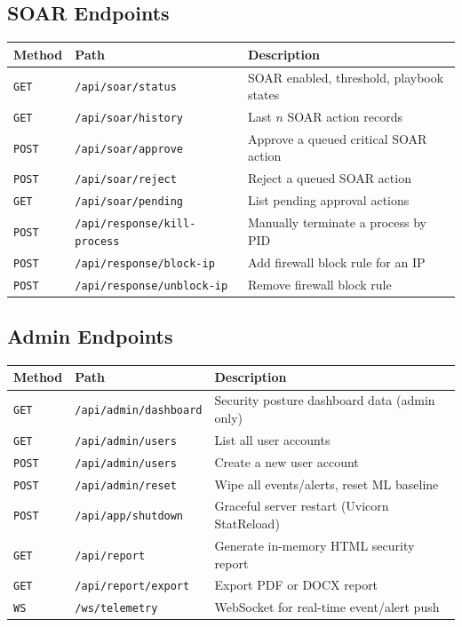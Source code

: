 \documentclass[12pt,a4paper]{article}
\begin{document}
\subsection{SOAR Endpoints}

\begin{table}[H]
\centering
\begin{tabularx}{\linewidth}{llX}
\toprule
\textbf{Method} & \textbf{Path} & \textbf{Description} \\
\midrule
\texttt{GET}  & \texttt{/api/soar/status}           & SOAR enabled, threshold, playbook states \\
\texttt{GET}  & \texttt{/api/soar/history}           & Last $n$ SOAR action records \\
\texttt{POST} & \texttt{/api/soar/approve}           & Approve a queued critical SOAR action \\
\texttt{POST} & \texttt{/api/soar/reject}            & Reject a queued SOAR action \\
\texttt{GET}  & \texttt{/api/soar/pending}           & List pending approval actions \\
\texttt{POST} & \texttt{/api/response/kill-process}  & Manually terminate a process by PID \\
\texttt{POST} & \texttt{/api/response/block-ip}      & Add firewall block rule for an IP \\
\texttt{POST} & \texttt{/api/response/unblock-ip}    & Remove firewall block rule \\
\bottomrule
\end{tabularx}
\end{table}

\subsection{Admin Endpoints}

\begin{table}[H]
\centering
\begin{tabularx}{\linewidth}{llX}
\toprule
\textbf{Method} & \textbf{Path} & \textbf{Description} \\
\midrule
\texttt{GET}  & \texttt{/api/admin/dashboard} & Security posture dashboard data (admin only) \\
\texttt{GET}  & \texttt{/api/admin/users}     & List all user accounts \\
\texttt{POST} & \texttt{/api/admin/users}     & Create a new user account \\
\texttt{POST} & \texttt{/api/admin/reset}     & Wipe all events/alerts, reset ML baseline \\
\texttt{POST} & \texttt{/api/app/shutdown}    & Graceful server restart (Uvicorn StatReload) \\
\texttt{GET}  & \texttt{/api/report}          & Generate in-memory HTML security report \\
\texttt{GET}  & \texttt{/api/report/export}   & Export PDF or DOCX report \\
\texttt{WS}   & \texttt{/ws/telemetry}        & WebSocket for real-time event/alert push \\
\bottomrule
\end{tabularx}
\end{table}
\end{document}
